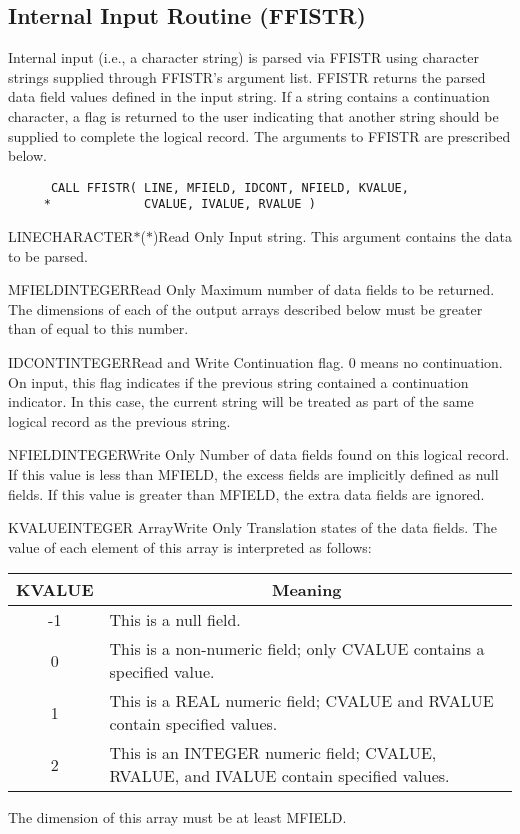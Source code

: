\subsection{Internal Input Routine (FFISTR)}\label{sec:ffistr}

Internal input (i.e., a character string) is parsed via FFISTR using
character strings supplied through FFISTR's argument list.  FFISTR returns
the parsed data field values defined in the input string. If a string
contains a continuation character, a flag is returned to the user indicating
that another string should be supplied to complete the logical record.
The arguments to FFISTR are prescribed below.
\begin{verbatim}
      CALL FFISTR( LINE, MFIELD, IDCONT, NFIELD, KVALUE,
     *             CVALUE, IVALUE, RVALUE )
\end{verbatim}

\begin{argy}{LINE}{CHARACTER$*$($*$)}{Read Only}
Input string. This argument contains the data to be parsed.
\end{argy}

\begin{argy}{MFIELD}{INTEGER}{Read Only}
Maximum number of data fields to be returned.
The dimensions of each of the output
arrays described below must be greater than of equal to this number.
\end{argy}

\begin{argy}{IDCONT}{INTEGER}{Read and Write}
Continuation flag. 0 means no continuation. On input, this flag indicates
if the previous string contained a continuation indicator. In this case, the
current string will be treated as part of the same logical record as the
previous string.
\end{argy}

\begin{argy}{NFIELD}{INTEGER}{Write Only}
Number of data fields found on this logical record.  If this value is less
than MFIELD, the excess fields are implicitly defined as null fields.  If
this value is greater than MFIELD, the extra data fields are ignored.
\end{argy}

\begin{argy}{KVALUE}{INTEGER Array}{Write Only}
Translation states of the data fields.  The value of
each element of this array is interpreted as follows:

\begin{tabular}{|cp{9 cm}|} \hline \hline
KVALUE & \multicolumn{1}{c|}{Meaning}\\ \hline
-1 & This is a null field.\\
0 & This is a non-numeric field; only CVALUE
contains a specified value.\\
1 & This is a REAL numeric field; CVALUE and
RVALUE contain specified values.\\
2 & This is an INTEGER numeric field; CVALUE,
RVALUE, and IVALUE contain specified values.\\ \hline \hline
\end{tabular}

The dimension of this array must be at least MFIELD.
\end{argy}

